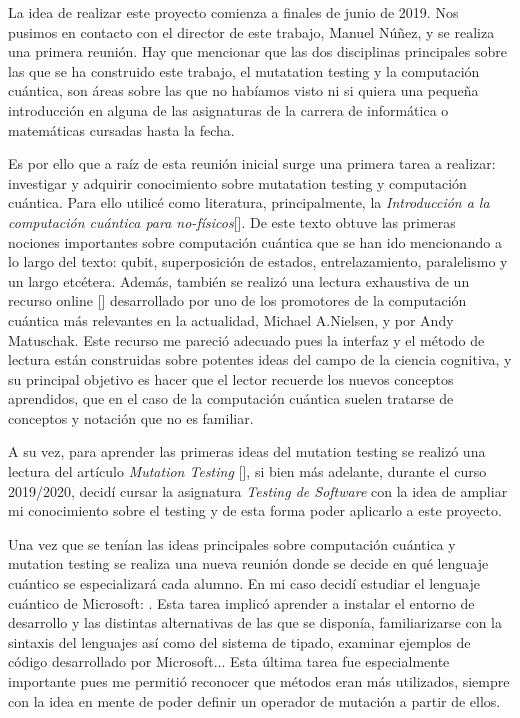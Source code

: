 La idea de realizar este proyecto comienza a finales de junio de 2019. Nos pusimos en contacto con el director de este trabajo, Manuel Núñez, y se realiza una primera reunión. Hay que mencionar que las dos disciplinas principales sobre las que se ha construido este trabajo, el mutatation testing y la computación cuántica, son áreas sobre las que no habíamos visto ni si quiera una pequeña introducción en alguna de las asignaturas de la carrera de informática o matemáticas cursadas hasta la fecha.

Es por ello que a raíz de esta reunión inicial surge una primera tarea a realizar: investigar y adquirir conocimiento sobre mutatation testing y computación cuántica. Para ello utilicé como literatura, principalmente, la \textit{Introducción a la computación cuántica para no-físicos}[\cite{rieffel2000introduction}]. De este texto obtuve las primeras nociones importantes sobre computación cuántica que se han ido mencionando a lo largo del texto: qubit, superposición de estados, entrelazamiento, paralelismo y un largo etcétera. Además, también se realizó una lectura exhaustiva de un recurso online [\cite{quantumcountry}] desarrollado por uno de los promotores de la computación cuántica más relevantes en la actualidad, Michael A.Nielsen, y por Andy Matuschak. Este recurso me pareció adecuado pues la interfaz y el método de lectura están construidas sobre potentes ideas del campo de la ciencia cognitiva, y su principal objetivo es hacer que el lector recuerde los nuevos conceptos aprendidos, que en el caso de la computación cuántica suelen tratarse de conceptos y notación que no es familiar.

A su vez, para aprender las primeras ideas del mutation testing se realizó una lectura del artículo \textit{Mutation Testing} [\cite{hierons2010mutation}], si bien más adelante, durante el curso 2019/2020,  decidí cursar la asignatura \textit{Testing de Software} con la idea de ampliar mi conocimiento sobre el testing y de esta forma poder aplicarlo a este proyecto.

Una vez que se tenían las ideas principales sobre computación cuántica y mutation testing se realiza una nueva reunión donde se decide en qué lenguaje cuántico se especializará cada alumno. En mi caso decidí estudiar el lenguaje cuántico de Microsoft: \qsh. Esta tarea implicó aprender a instalar el entorno de desarrollo y las distintas alternativas de las que se disponía, familiarizarse con la sintaxis del lenguajes así como del sistema de tipado, examinar ejemplos de código desarrollado por Microsoft... Esta última tarea fue especialmente importante pues me permitió reconocer que métodos eran más utilizados, siempre con la idea en mente de poder definir un operador de mutación a partir de ellos.

